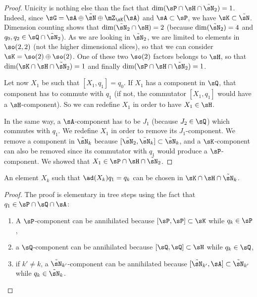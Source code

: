 \begin{proof}
	Unicity is nothing else than the fact that $\dim(\sP\cap\sH\cap\tilde\sN_2)=1$. Indeed, since $\sG=\sA\oplus\tilde\sN\oplus\mZ_{\sK}(\sA)$ and $\sA\subset\sP$, we have $\sK\subset\tilde\sN$. Dimension counting shows that $\dim(\tilde\sN_2\cap\sH)=2$ (because $\dim(\tilde\sN_2)=4$ and $q_0,q_2\in\sQ\cap\tilde\sN_2$). As we are looking in $\tilde\sN_2$, we are limited to elements in $\so(2,2)$ (not the higher dimensional slices), so that we can consider $\sK=\so(2)\oplus\so(2)$. One of these two $\so(2)$ factors belongs to $\sH$, so that $\dim(\sK\cap\sH\cap\tilde\sN_2)=1$  and finally $\dim(\sP\cap\sH\cap\tilde\sN_2)=1$.

	Let now $X_1$ be such that $[X_1,q_1]=q_0$. If $X_1$ has a component in $\sQ$, that component has to commute with $q_1$ (if not, the commutator $[X_1,q_1]$ would have a $\sH$-component). So we can redefine $X_1$ in order to have $X_1\in\sH$.

	In the same way, a $\sA$-component has to be $J_1$ (because $J_2\in\sQ$) which commutes with $q_1$. We redefine $X_1$ in order to remove its $J_1$-component. We remove a component in $\tilde\sN_k$ because $[\tilde\sN_2,\tilde\sN_k]\subset\tilde\sN_k$, and a $\sK$-component can also be removed since its commutator with $q_1$ would produce a $\sP$-component. We showed that $X_1\in\sP\cap\sH\cap\tilde\sN_2$.
\end{proof}

\begin{lemma}		\label{LONGLemChoixDeXk}
	An element $X_k$ such that $\ad(X_k)q_1=q_k$ can be chosen in $\sK\cap\sH\cap\tilde\sN_k$.
\end{lemma}

\begin{proof}
	The proof is elementary in tree steps using the fact that $q_1\in\sP\cap\sQ\cap\sA$:
	\begin{enumerate}
		\item
		      A $\sP$-component can be annihilated because $[\sP,\sP]\subset\sK$ while $q_k\in\sP$,
		\item
		      a $\sQ$-component can be annihilated because $[\sQ,\sQ]\subset\sH$ while $q_k\in\sQ$,
		\item
		      if $k'\neq k$, a $\tilde\sN_{k'}$-component can be annihilated because $[\tilde\sN_{k'},\sA]\subset\tilde\sN_{k'}$ while $q_k\in\tilde\sN_k$.
	\end{enumerate}
\end{proof}


